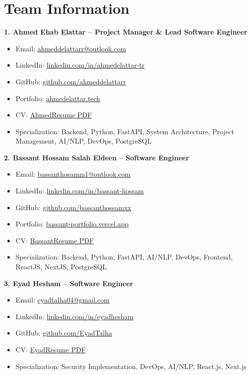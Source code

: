 \documentclass[12pt,a4paper]{article}
\begin{document}
\section*{Team Information}

\textbf{1. Ahmed Ehab Elattar – Project Manager \& Lead Software Engineer}
\begin{itemize}
    \item Email: \href{mailto:ahmeddelattarr@outlook.com}{ahmeddelattarr@outlook.com}
    \item LinkedIn: \href{https://www.linkedin.com/in/ahmedelattar-tr}{linkedin.com/in/ahmedelattar-tr}
    \item GitHub: \href{https://github.com/ahmeddelattarr}{github.com/ahmeddelattarr}
    \item Portfolio: \href{https://www.ahmedelattar.tech}{ahmedelattar.tech}
    \item CV: \href{https://www.ahmedelattar.tech/resume.pdf}{AhmedResume PDF}
    \item Specialization: Backend, Python, FastAPI, System Architecture, Project Management, AI/NLP, DevOps, PostgreSQL
\end{itemize}

\textbf{2. Bassant Hossam Salah Eldeen – Software Engineer}
\begin{itemize}
    \item Email: \href{mailto:bassanthosamm1@outlook.com}{bassanthosamm1@outlook.com}
    \item LinkedIn: \href{https://www.linkedin.com/in/bassant-hossam-5a4177264}{linkedin.com/in/bassant-hossam}
     \item GitHub: \href{https://github.com/Bassanthossamxx}{github.com/bassanthossamxx}
    \item Portfolio: \href{https://bassant-portfolio.vercel.app}{bassant-portfolio.vercel.app}
    \item CV: \href{https://drive.google.com/file/d/1epJsbSlidr-4DMwGAZaaj0DmsOJFBSXn/view}{BassantResume PDF}
    \item Specialization: Backend, Python, FastAPI, AI/NLP, DevOps, Frontend, ReactJS, NextJS, PostgreSQL
\end{itemize}

\textbf{3. Eyad Hesham – Software Engineer}
\begin{itemize}
    \item Email: \href{mailto:eyadtalha04@gmail.com}{eyadtalha04@gmail.com}
    \item LinkedIn: \href{https://www.linkedin.com/in/eyadhesham}{linkedin.com/in/eyadhesham}
    \item GitHub: \href{https://github.com/EyadTalha}{github.com/EyadTalha}
    \item CV: \href{https://drive.google.com/file/d/1gIWggXZtLGkVX9wEBdzE1umS1afZiNBz/view?usp=sharing}{EyadResume PDF}
    \item Specialization: Security Implementation, DevOps, AI/NLP, React.js, Next.js
\end{itemize}
\end{document}
